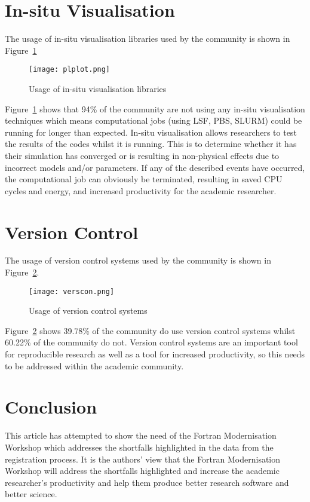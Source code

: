 \documentclass[12pt]{article}
\begin{document}
\section{In-situ Visualisation}\label{isv}
The usage of in-situ visualisation libraries used by the community is shown in 
Figure~\ref{plplot:png}
\begin{figure}[H]
\begin{center}
\texttt{[image: plplot.png]}
\caption{Usage of in-situ visualisation libraries}\label{plplot:png}
\end{center}
\end{figure}
Figure~\ref{plplot:png} shows that 94\% of the community are not using any
in-situ visualisation techniques which means computational jobs (using LSF, PBS, SLURM) 
could be running for longer than expected. In-situ visualisation allows researchers to 
test the results of the codes whilst it is running. This is to determine whether it has 
their simulation has converged or is resulting in non-physical effects due to incorrect
models and/or parameters. If any of the described events have occurred, the computational
job can obviously be terminated, resulting in saved CPU cycles and energy, and
increased productivity for the academic researcher. 
%
\section{Version Control}\label{vc}
The usage of version control systems used by the community is shown in 
Figure~\ref{verscon:png}.
\begin{figure}[H]
\begin{center}
\texttt{[image: verscon.png]}
\caption{Usage of version control systems}\label{verscon:png}
\end{center}
\end{figure}
Figure~\ref{verscon:png} shows 39.78\% of the community do use version control systems
whilst 60.22\% of the community do not. Version control systems are an important
tool for reproducible research as well as a tool for increased productivity, so
this needs to be addressed within the academic community. 
%
\section{Conclusion}
This article has attempted to show the need of the Fortran Modernisation Workshop
which addresses the shortfalls highlighted in the data from the registration process. 
It is the authors' view that the Fortran Modernisation Workshop will address the
shortfalls highlighted and increase the academic researcher's productivity and help them
produce better research software and better science. 


\end{document}
